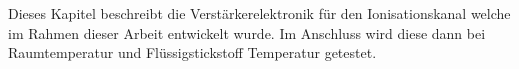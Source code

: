 Dieses Kapitel beschreibt die Verstärkerelektronik für den Ionisationskanal welche im Rahmen dieser Arbeit entwickelt wurde.
Im Anschluss wird diese dann bei Raumtemperatur und Flüssigstickstoff Temperatur getestet.
